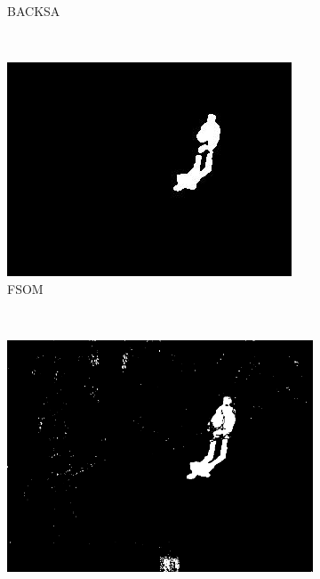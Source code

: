 \begin{figure}
\begin{subfigure}[b]{0.19\textwidth}
                \caption{BACKSA}
                \label{fig:cp02_backsaMask}
        \end{subfigure}%
        ~ %
        \begin{subfigure}[b]{0.19\textwidth}
                \centering
                \includegraphics[width=\textwidth]{fig15.jpg}
                \caption{FSOM}
                \label{fig:cp02_fsomMask}
        \end{subfigure}%
        ~ %
        \begin{subfigure}[b]{0.19\textwidth}
                \centering
                \includegraphics[width=\textwidth]{fig16.jpg}

\end{subfigure}
\end{figure}
